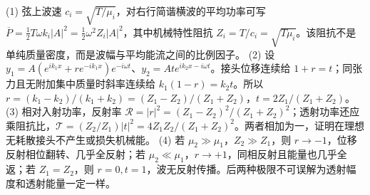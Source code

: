 (1) 弦上波速 \(c_i=\sqrt{T/\mu_i}\)，对右行简谐横波的平均功率可写 \(\overline P=\tfrac12T\omega k_i|A|^2=\tfrac12\omega^2Z_i|A|^2\)，其中机械特性阻抗 \(Z_i=T/c_i=\sqrt{T\mu_i}\)。该阻抗不是单纯质量密度，而是波幅与平均能流之间的比例因子。
(2) 设 \(y_1=A(e^{ik_1x}+r e^{-ik_1x})e^{-i\omega t}\)、\(y_2=At e^{ik_2x-i\omega t}\)。接头位移连续给 \(1+r=t\)；同张力且无附加集中质量时斜率连续给 \(k_1(1-r)=k_2t\)。所以 \(r=(k_1-k_2)/(k_1+k_2)=(Z_1-Z_2)/(Z_1+Z_2)\)，\(t=2Z_1/(Z_1+Z_2)\)。
(3) 相对入射功率，反射率 \(\mathcal R=|r|^2=(Z_1-Z_2)^2/(Z_1+Z_2)^2\)；透射功率还应乘阻抗比，\(\mathcal T=(Z_2/Z_1)|t|^2=4Z_1Z_2/(Z_1+Z_2)^2\)。两者相加为一，证明在理想无耗散接头不产生或损失机械能。
(4) 若 \(\mu_2\gg\mu_1\)，\(Z_2\gg Z_1\)，则 \(r\to-1\)，位移反射相位翻转、几乎全反射；若 \(\mu_2\ll\mu_1\)，\(r\to+1\)，同相反射且能量也几乎全返；若 \(Z_1=Z_2\)，则 \(r=0,t=1\)，波无反射传播。后两种极限不可误解为透射幅度和透射能量一定一样。

